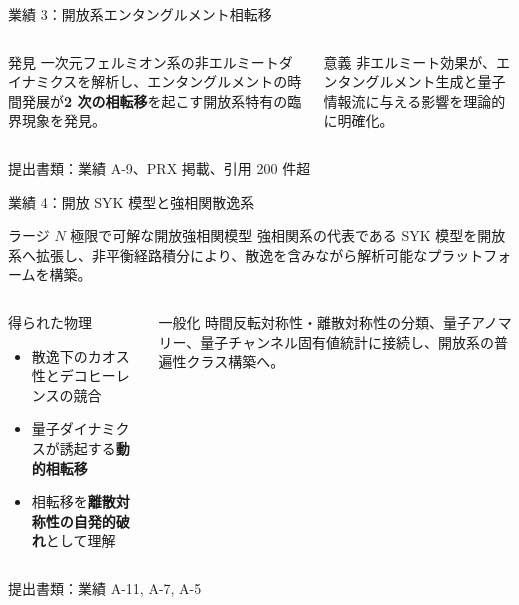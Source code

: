 \documentclass[aspectratio=169,11pt]{beamer}
\newcommand{\key}[1]{\textcolor{accent}{\bfseries #1}}
\newcommand{\smallcite}[1]{{\scriptsize\color{gray}#1}}
\begin{document}
\begin{frame}{業績 3：開放系エンタングルメント相転移}
\begin{columns}[T]
\begin{block}{発見}
一次元フェルミオン系の非エルミートダイナミクスを解析し、エンタングルメントの時間発展が\key{2 次の相転移}を起こす開放系特有の臨界現象を発見。
\end{block}
\begin{block}{意義}
非エルミート効果が、エンタングルメント生成と量子情報流に与える影響を理論的に明確化。
\end{block}
\centering
{}
\end{columns}
\smallcite{提出書類：業績 A-9、PRX 掲載、引用 200 件超}
\end{frame}

\begin{frame}{業績 4：開放 SYK 模型と強相関散逸系}
\begin{block}{ラージ $N$ 極限で可解な開放強相関模型}
強相関系の代表である SYK 模型を開放系へ拡張し、非平衡経路積分により、散逸を含みながら解析可能なプラットフォームを構築。
\end{block}
\begin{columns}[T]
\begin{block}{得られた物理}
\begin{itemize}
  \item 散逸下のカオス性とデコヒーレンスの競合
  \item 量子ダイナミクスが誘起する\key{動的相転移}
  \item 相転移を\key{離散対称性の自発的破れ}として理解
\end{itemize}
\end{block}
\begin{block}{一般化}
時間反転対称性・離散対称性の分類、量子アノマリー、量子チャンネル固有値統計に接続し、開放系の普遍性クラス構築へ。
\end{block}
\end{columns}
\smallcite{提出書類：業績 A-11, A-7, A-5}
\end{frame}
\end{document}
